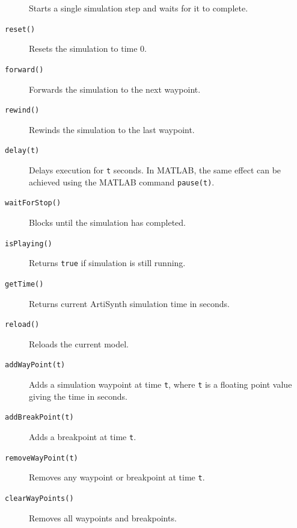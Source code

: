 \documentclass{article}
\begin{document}
\begin{description}
Starts a single simulation step and waits for it to complete.

\item[{\tt reset()}] \mbox{}

Resets the simulation to time 0.

\item[{\tt forward()}] \mbox{}

Forwards the simulation to the next waypoint.

\item[{\tt rewind()}] \mbox{}

Rewinds the simulation to the last waypoint.

\item[{\tt delay(t)}] \mbox{}

Delays execution for {\tt t} seconds. In MATLAB, the same effect can
be achieved using the MATLAB command {\tt pause(t)}.

\item[{\tt waitForStop()}] \mbox{}

Blocks until the simulation has completed.

\item[{\tt isPlaying()}] \mbox{}

Returns {\tt true} if simulation is still running.

\item[{\tt getTime()}] \mbox{}

Returns current ArtiSynth simulation time in seconds.

\item[{\tt reload()}] \mbox{}

Reloads the current model.

\item[{\tt addWayPoint(t)}] \mbox{}

Adds a simulation waypoint at time {\tt t},
where {\tt t} is a floating point value giving
the time in seconds.

\item[{\tt addBreakPoint(t)}] \mbox{}

Adds a breakpoint at time {\tt t}.

\item[{\tt removeWayPoint(t)}] \mbox{}

Removes any waypoint or breakpoint at time {\tt t}.

\item[{\tt clearWayPoints()}] \mbox{}

Removes all waypoints and breakpoints.


\end{description}
\end{document}
